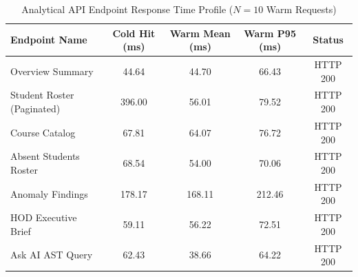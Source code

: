 \begin{table}[h]
\centering
\small
\caption{Analytical API Endpoint Response Time Profile ($N=10$ Warm Requests)}
\label{tab:latency}
\begin{tabular}{lcccc}
\toprule
\textbf{Endpoint Name} & \textbf{Cold Hit (ms)} & \textbf{Warm Mean (ms)} & \textbf{Warm P95 (ms)} & \textbf{Status} \\
\midrule
Overview Summary & 44.64 & 44.70 & 66.43 & HTTP 200 \\
Student Roster (Paginated) & 396.00 & 56.01 & 79.52 & HTTP 200 \\
Course Catalog & 67.81 & 64.07 & 76.72 & HTTP 200 \\
Absent Students Roster & 68.54 & 54.00 & 70.06 & HTTP 200 \\
Anomaly Findings & 178.17 & 168.11 & 212.46 & HTTP 200 \\
HOD Executive Brief & 59.11 & 56.22 & 72.51 & HTTP 200 \\
Ask AI AST Query & 62.43 & 38.66 & 64.22 & HTTP 200 \\
\bottomrule
\end{tabular}
\end{table}
